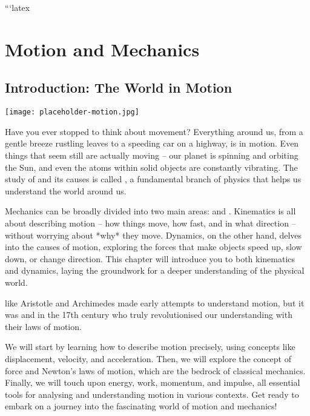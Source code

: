 ```latex
\chapter{Motion and Mechanics}

\section{Introduction: The World in Motion}

\begin{marginfigure}
  \texttt{[image: placeholder-motion.jpg]}
  \label{fig:motion-intro}
\end{marginfigure}

Have you ever stopped to think about movement?  Everything around us, from a gentle breeze rustling leaves to a speeding car on a highway, is in motion.  Even things that seem still are actually moving – our planet is spinning and orbiting the Sun, and even the atoms within solid objects are constantly vibrating. The study of  and its causes is called , a fundamental branch of physics that helps us understand the world around us.

Mechanics can be broadly divided into two main areas:  and . Kinematics is all about describing motion – how things move, how fast, and in what direction – without worrying about *why* they move. Dynamics, on the other hand, delves into the causes of motion, exploring the forces that make objects speed up, slow down, or change direction.  This chapter will introduce you to both kinematics and dynamics, laying the groundwork for a deeper understanding of the physical world.

\begin{marginnote}
 like Aristotle and Archimedes made early attempts to understand motion, but it was  and  in the 17th century who truly revolutionised our understanding with their laws of motion.
\end{marginnote}

We will start by learning how to describe motion precisely, using concepts like displacement, velocity, and acceleration. Then, we will explore the concept of force and Newton's laws of motion, which are the bedrock of classical mechanics.  Finally, we will touch upon energy, work, momentum, and impulse, all essential tools for analysing and understanding motion in various contexts. Get ready to embark on a journey into the fascinating world of motion and mechanics!

